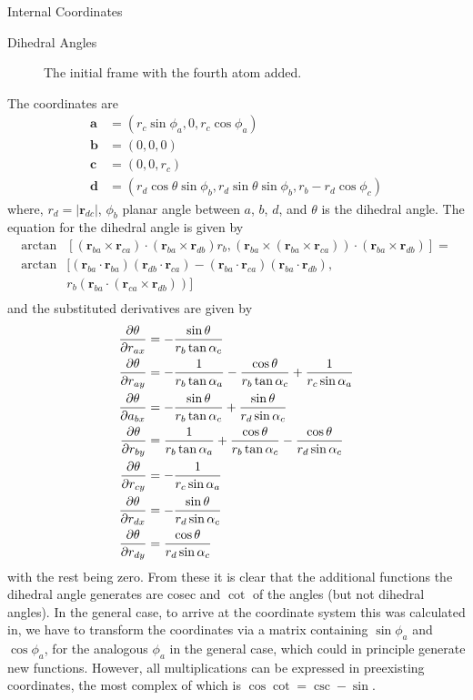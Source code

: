 \documentclass{article}
\newcommand{\vect}[1]{\boldsymbol{#1}}
\begin{document}
\begin{subsection}{Internal Coordinates}
\begin{subsubsection}{Dihedral Angles}
\begin{figure}[htbp!]
	\caption{The initial frame with the fourth atom added.}
	\label{fig:fourthatom}
\end{figure}	
		The coordinates are 
\[
\begin{split}
	\vect{a} &= (r_{c} \sin\phi_{a}, 0, r_{c} \cos \phi_{a})\\
    \vect{b} &= (0,0,0) \\
    \vect{c} &= (0,0,r_{c}) \\
	\vect{d} &= (r_{d} \cos\theta \sin\phi_b, r_{d} \sin\theta \sin\phi_{b},r_{b} - r_{d}\cos\phi_c) 
\end{split}
\]
		where, $r_d = |\vect{r}_{dc}|$, $\phi_b$ planar angle between  $a$, $b$, $d$, and $\theta$ is the dihedral angle. The equation for the dihedral angle is given by  
\[
\begin{split}
	\arctan&[(\vect{r}_{ba}\times \vect{r}_{ca})\cdot (\vect{r}_{ba} \times \vect{r}_{db}) r_b,  (\vect{r}_{ba} \times  (\vect{r}_{ba} \times \vect{r}_{ca}))\cdot (\vect{r}_{ba} \times \vect{r}_{db})] =\\
\arctan&[   (\vect{r}_{ba}\cdot\vect{r}_{ba})(\vect{r}_{db}\cdot\vect{r}_{ca}) - (\vect{r}_{ba}\cdot\vect{r}_{ca})(\vect{r}_{ba}\cdot\vect{r}_{db}),\\
	&r_b(\vect{r}_{ba}\cdot(\vect{r}_{ca} \times \vect{r}_{db})) ] \\
\end{split}
\]
and the substituted derivatives are given by
\[
\begin{split}
	\pdv{\theta}{r_{ax}} &= - \frac{\sin\theta}{r_{b}\tan\alpha_{c}}   \\
	\pdv{\theta}{r_{ay}} &= -\frac{1}{r_b \tan \alpha_a} - \frac{\cos \theta}{r_b\tan \alpha_c} + \frac{1}{r_c \sin \alpha_a} \\
	\pdv{\theta}{a_{bx}} &= - \frac{\sin \theta}{r_b \tan \alpha_c} + \frac{\sin \theta}{r_d \sin \alpha_c} \\
	\pdv{\theta}{r_{by}} &= \frac{1}{r_b \tan \alpha_a} + \frac{\cos \theta}{r_b\tan \alpha_c} - \frac{\cos \theta}{r_d \sin \alpha_c} \\
	\pdv{\theta}{r_{cy}} &= -\frac{1}{r_c \sin \alpha_a} \\
	\pdv{\theta}{r_{dx}} &= -\frac{\sin \theta}{r_d \sin \alpha_c} \\
	\pdv{\theta}{r_{dy}} &= \frac{\cos \theta}{r_d \sin \alpha_c} \\
\end{split}
\]
with the rest being zero. From these it is clear that the additional functions the dihedral angle generates are cosec and $\cot$ of the angles (but not dihedral angles).
In the general case, to arrive at the coordinate system this was calculated in, we have to transform the coordinates via a matrix containing $\sin \phi_a$ and $\cos \phi_a$, for the analogous $\phi_a$ in the general case, which could in principle generate new functions. However, all multiplications can be expressed in preexisting coordinates, the most complex of which is $\cos \cot = \csc - \sin$.
	\end{subsubsection}
	\end{subsection}
\end{document}
